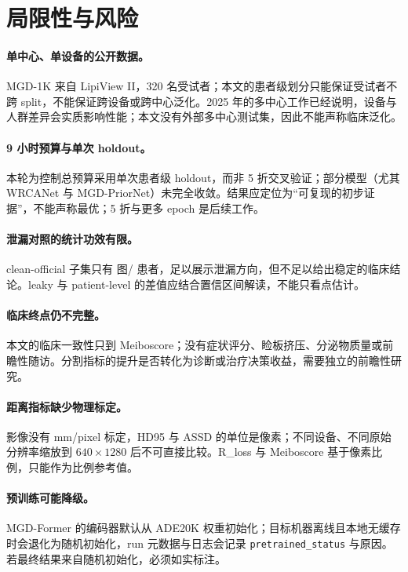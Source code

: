 \section{局限性与风险}\label{sec:limitations}

\paragraph{单中心、单设备的公开数据。}MGD-1K 来自 LipiView II，320 名受试者；本文的患者级划分只能保证受试者不跨 split，不能保证跨设备或跨中心泛化。2025 年的多中心工作已经说明，设备与人群差异会实质影响性能\cite{li2025multicenter}；本文没有外部多中心测试集，因此不能声称临床泛化。

\paragraph{9 小时预算与单次 holdout。}本轮为控制总预算采用单次患者级 holdout，而非 5 折交叉验证；部分模型（尤其 WRCANet 与 MGD-PriorNet）未完全收敛。结果应定位为“可复现的初步证据”，不能声称最优；5 折与更多 epoch 是后续工作。

\paragraph{泄漏对照的统计功效有限。}clean-official 子集只有 \cleanOfficialImages{} 图/\cleanOfficialPatients{} 患者，足以展示泄漏方向，但不足以给出稳定的临床结论。leaky 与 patient-level 的差值应结合置信区间解读，不能只看点估计。

\paragraph{临床终点仍不完整。}本文的临床一致性只到 Meiboscore；没有症状评分、睑板挤压、分泌物质量或前瞻性随访。分割指标的提升是否转化为诊断或治疗决策收益，需要独立的前瞻性研究。

\paragraph{距离指标缺少物理标定。}影像没有 mm/pixel 标定，HD95 与 ASSD 的单位是像素；不同设备、不同原始分辨率缩放到 $640\times1280$ 后不可直接比较。R\_loss 与 Meiboscore 基于像素比例，只能作为比例参考值。

\paragraph{预训练可能降级。}MGD-Former 的编码器默认从 ADE20K 权重初始化；目标机器离线且本地无缓存时会退化为随机初始化，run 元数据与日志会记录 \texttt{pretrained\_status} 与原因。若最终结果来自随机初始化，必须如实标注。

